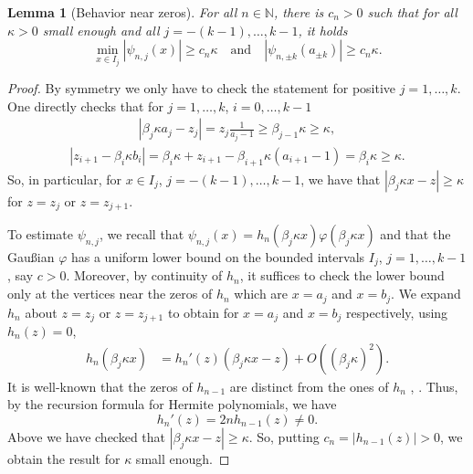 \documentclass[12pt, reqno]{amsart}
\newtheorem{lemma}[theorem]{Lemma}
\theoremstyle{definition}
\numberwithin{equation}{section}
\newcommand{\N}{{\mathbb N}}
\begin{document}
\begin{lemma}[Behavior near zeros]\label{lem:lower_bound_hermite}
    For all $n\in \N$, there is $c_n>0$ such that for all $\kappa>0$ small enough and all $j=-(k-1),\ldots,k-1$, it holds
    $$\min_{x\in I_j} |\psi_{n,j}(x)| \geq c_n \kappa\quad\mbox{and}\quad |\psi_{n,\pm k}(a_{\pm k})| \geq c_n\kappa. $$
\end{lemma}
\begin{proof}
By symmetry we only have to check the statement for positive $j=1,\ldots,k$.
One directly checks that for $j=1,\ldots,k$, $i=0,\ldots,k-1$
\begin{align*}
    | \beta_j\kappa a_j- z_j  |= z_j\frac{1}{a_j-1}\ge \beta_{j-1}\kappa \ge\kappa,
\end{align*}\begin{align*}
     | z_{i+1}-\beta_i\kappa b_i   |%
     =\beta_i\kappa+z_{i+1} -\beta_{i+1}\kappa(a_{i+1}-1)   = \beta_{i}\kappa \ge\kappa.
\end{align*}
So, in particular, for $x\in I_j$, $j=-(k-1),\ldots,k-1$, we have that $| \beta_j\kappa x- z  | \geq {\kappa}$ for $z=z_j$ or $z=z_{j+1}  $.

To estimate $\psi_{n,j}$, we recall that $\psi_{n,j}(x)=h_n(\beta_j\kappa x)\varphi(\beta_j\kappa x)$ and that the Gaußian $\varphi$ has a uniform lower bound on the bounded intervals $I_j$, $j=1,\ldots,k-1$, say $c>0$. 
Moreover, by continuity of $h_n$, it suffices to check the lower bound only at the vertices near the  zeros of $h_n$ which are $x=a_j$ and $x=b_j$.
We expand $h_n$ about $z=z_j$ or $z=z_{j+1}$ to obtain for $x=a_j$ and $x=b_j$ respectively, using $h_n(z)=0$,
\begin{align*}
    h_n(\beta_j\kappa x)%
    &= h_n'(z)(\beta_j\kappa x - z) + O((\beta_j\kappa)^2).
\end{align*}
It is well-known that the zeros of $h_{n-1}$ are distinct from the ones of $h_n$ \cite[Section 22.16(iii)]{Abramowitz_Stegun_72}, \cite[Theorem 3.3.1]{Szego}.  Thus, by the recursion formula for Hermite polynomials, we have
$$h_n'(z) = 2n h_{n-1}(z) \neq 0.$$
Above we have checked that $|\beta_j\kappa x - z|\ge \kappa$. So,  putting $c_n= |h_{n-1}(z)| >0$, we obtain the result for $\kappa$ small enough.
\end{proof}
\end{document}
